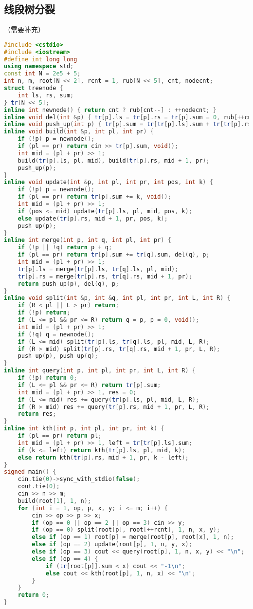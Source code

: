 \documentclass[9pt, a4paper, oneside]{book}
\begin{document}
\subsection{线段树分裂}
（需要补充）
\begin{lstlisting}[language={C++}]
#include <cstdio>
#include <iostream>
#define int long long
using namespace std;
const int N = 2e5 + 5;
int n, m, root[N << 2], rcnt = 1, rub[N << 5], cnt, nodecnt;
struct treenode {
    int ls, rs, sum;
} tr[N << 5];
inline int newnode() { return cnt ? rub[cnt--] : ++nodecnt; }
inline void del(int &p) { tr[p].ls = tr[p].rs = tr[p].sum = 0, rub[++cnt] = p, p = 0; }
inline void push_up(int p) { tr[p].sum = tr[tr[p].ls].sum + tr[tr[p].rs].sum; }
inline void build(int &p, int pl, int pr) {
    if (!p) p = newnode();
    if (pl == pr) return cin >> tr[p].sum, void();
    int mid = (pl + pr) >> 1;
    build(tr[p].ls, pl, mid), build(tr[p].rs, mid + 1, pr);
    push_up(p);
}
inline void update(int &p, int pl, int pr, int pos, int k) {
    if (!p) p = newnode();
    if (pl == pr) return tr[p].sum += k, void();
    int mid = (pl + pr) >> 1;
    if (pos <= mid) update(tr[p].ls, pl, mid, pos, k);
    else update(tr[p].rs, mid + 1, pr, pos, k);
    push_up(p);
}
inline int merge(int p, int q, int pl, int pr) {
    if (!p || !q) return p + q;
    if (pl == pr) return tr[p].sum += tr[q].sum, del(q), p;
    int mid = (pl + pr) >> 1;
    tr[p].ls = merge(tr[p].ls, tr[q].ls, pl, mid);
    tr[p].rs = merge(tr[p].rs, tr[q].rs, mid + 1, pr);
    return push_up(p), del(q), p;
}
inline void split(int &p, int &q, int pl, int pr, int L, int R) {
    if (R < pl || L > pr) return;
    if (!p) return;
    if (L <= pl && pr <= R) return q = p, p = 0, void();
    int mid = (pl + pr) >> 1;
    if (!q) q = newnode();
    if (L <= mid) split(tr[p].ls, tr[q].ls, pl, mid, L, R);
    if (R > mid) split(tr[p].rs, tr[q].rs, mid + 1, pr, L, R);
    push_up(p), push_up(q);
}
inline int query(int p, int pl, int pr, int L, int R) {
    if (!p) return 0;
    if (L <= pl && pr <= R) return tr[p].sum;
    int mid = (pl + pr) >> 1, res = 0;
    if (L <= mid) res += query(tr[p].ls, pl, mid, L, R);
    if (R > mid) res += query(tr[p].rs, mid + 1, pr, L, R);
    return res;
}
inline int kth(int p, int pl, int pr, int k) {
    if (pl == pr) return pl;
    int mid = (pl + pr) >> 1, left = tr[tr[p].ls].sum;
    if (k <= left) return kth(tr[p].ls, pl, mid, k);
    else return kth(tr[p].rs, mid + 1, pr, k - left);
}
signed main() {
    cin.tie(0)->sync_with_stdio(false);
    cout.tie(0);
    cin >> n >> m;
    build(root[1], 1, n);
    for (int i = 1, op, p, x, y; i <= m; i++) {
        cin >> op >> p >> x;
        if (op == 0 || op == 2 || op == 3) cin >> y;
        if (op == 0) split(root[p], root[++rcnt], 1, n, x, y);
        else if (op == 1) root[p] = merge(root[p], root[x], 1, n);
        else if (op == 2) update(root[p], 1, n, y, x);
        else if (op == 3) cout << query(root[p], 1, n, x, y) << "\n";
        else if (op == 4) {
            if (tr[root[p]].sum < x) cout << "-1\n";
            else cout << kth(root[p], 1, n, x) << "\n";
        }
    }
    return 0;
}\end{lstlisting}
\end{document}
